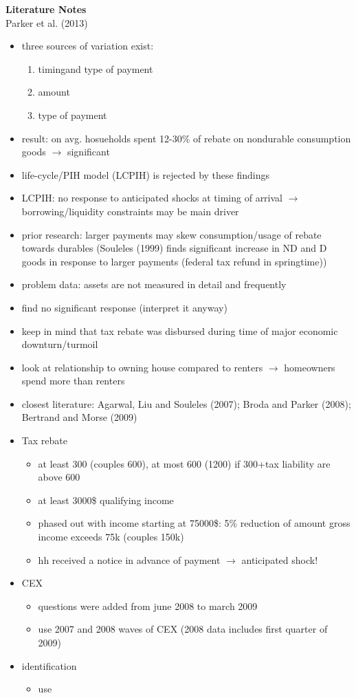 \textbf{Literature Notes}\\ 
Parker et al. (2013) 
\begin{itemize}
    \item three sources of variation exist: 
    \begin{enumerate}
        \item timingand type of payment
        \item amount 
        \item type of payment
    \end{enumerate}
    \item result: on avg. hosueholds spent 12-30\% of rebate on nondurable consumption goods $\rightarrow$ significant 
    \item life-cycle/PIH model (LCPIH) is rejected by these findings 
    \item LCPIH: no response to anticipated shocks at timing of arrival $\rightarrow$ borrowing/liquidity constraints may be main driver 
    \item prior research: larger payments may skew consumption/usage of rebate towards durables (Souleles (1999) finds significant increase in ND and D goods in response to larger payments (federal tax refund in springtime))
    \item problem data: assets are not measured in detail and frequently 
    \item find no significant response (interpret it anyway)
    \item keep in mind that tax rebate was disbursed during time of major economic downturn/turmoil
    \item look at relationship to owning house compared to renters $\rightarrow$ homeowners spend more than renters
    \item closest literature: Agarwal, Liu and Souleles (2007); Broda and Parker (2008); Bertrand and Morse (2009)
    \item Tax rebate 
    \begin{itemize}
        \item at least 300 (couples 600), at most 600 (1200) if 300+tax liability are above 600 
        \item at least 3000\$ qualifying income 
        \item phased out with income starting at 75000\$: 5\% reduction of amount gross income exceeds 75k (couples 150k)
        \item hh received a notice in advance of payment $\rightarrow$ anticipated shock!
    \end{itemize}
    \item CEX 
    \begin{itemize}
        \item questions were added from june 2008 to march 2009 
        \item use 2007 and 2008 waves of CEX (2008 data includes first quarter of 2009)
    \end{itemize}
    \item identification 
    \begin{itemize}
        \item use 
    \end{itemize}  
\end{itemize}